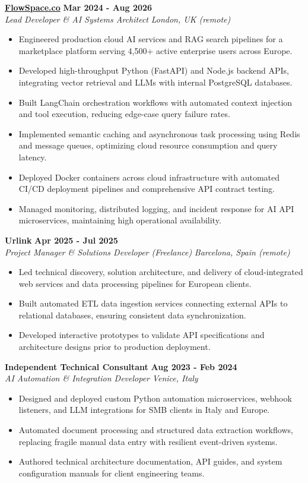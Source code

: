 \documentclass[10pt,a4paper]{article}
\newcommand{\role}[4]{%
  \textbf{#1} \hfill \textbf{#2}\\[1pt]%
  \textit{#3} \hfill \textit{#4}\\[2pt]%
}
\begin{document}
\role{\href{https://flowspace.co}{FlowSpace.co}}{Mar 2024 - Aug 2026}{Lead Developer \& AI Systems Architect}{London, UK (remote)}
\begin{itemize}
  \item Engineered production cloud AI services and RAG search pipelines for a marketplace platform serving 4,500+ active enterprise users across Europe.
  \item Developed high-throughput Python (FastAPI) and Node.js backend APIs, integrating vector retrieval and LLMs with internal PostgreSQL databases.
  \item Built LangChain orchestration workflows with automated context injection and tool execution, reducing edge-case query failure rates.
  \item Implemented semantic caching and asynchronous task processing using Redis and message queues, optimizing cloud resource consumption and query latency.
  \item Deployed Docker containers across cloud infrastructure with automated CI/CD deployment pipelines and comprehensive API contract testing.
  \item Managed monitoring, distributed logging, and incident response for AI API microservices, maintaining high operational availability.
\end{itemize}

\role{Urlink}{Apr 2025 - Jul 2025}{Project Manager \& Solutions Developer (Freelance)}{Barcelona, Spain (remote)}
\begin{itemize}
  \item Led technical discovery, solution architecture, and delivery of cloud-integrated web services and data processing pipelines for European clients.
  \item Built automated ETL data ingestion services connecting external APIs to relational databases, ensuring consistent data synchronization.
  \item Developed interactive prototypes to validate API specifications and architecture designs prior to production deployment.
\end{itemize}

\role{Independent Technical Consultant}{Aug 2023 - Feb 2024}{AI Automation \& Integration Developer}{Venice, Italy}
\begin{itemize}
  \item Designed and deployed custom Python automation microservices, webhook listeners, and LLM integrations for SMB clients in Italy and Europe.
  \item Automated document processing and structured data extraction workflows, replacing fragile manual data entry with resilient event-driven systems.
  \item Authored technical architecture documentation, API guides, and system configuration manuals for client engineering teams.
\end{itemize}
\end{document}
